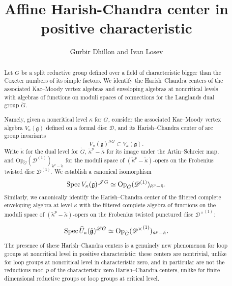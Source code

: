 \documentclass{amsart}
\title{Affine Harish-Chandra center in positive characteristic}
\author{Gurbir Dhillon and Ivan Losev}
\theoremstyle{definition}
\newcommand{\fg}{\mathfrak{g}}
\newcommand{\Spec}{\on{Spec}\hspace{.5mm}}
\newcommand{\fr}{^\on{(1)}}
\newcommand{\sD}{\mathscr{D}}
\newcommand{\on}{\mathrm}
\newcommand{\Jet}{\mathscr{J}}
\newcommand{\Loop}{\mathscr{L}}
\newcommand{\pD}{\sD^\times}
\newcommand{\ckappa}{\check{\kappa}}
\newcommand{\Op}{\on{Op}}
\newcommand{\ASk}{\ckappa^p - \ckappa}
\numberwithin{equation}{section}
\begin{document}
\begin{abstract} { Let $G$ be a split reductive group defined over a field of characteristic bigger than the Coxeter numbers of its simple factors. We identify the Harish--Chandra centers of the associated Kac--Moody vertex algebras and enveloping algebras at noncritical levels  with algebras of functions on moduli spaces of connections for the Langlands dual group $\check{G}$.


Namely, given a noncritical level $\kappa$ for $G$,  consider the associated Kac--Moody vertex algebra $V_\kappa(\fg)$ defined on a formal disc $\sD$, and its Harish--Chandra center of arc group invariants $$V_\kappa(\fg)^{\Jet G} \subset V_\kappa(\fg).$$
Write $\ckappa$ for the dual level for $\check{G}$, $\ckappa^p - \ckappa$ for its image under the Artin--Schreier map, and $\Op_{\check{G}}(\sD\fr)_{\ASk}$ for the moduli space of $(\ckappa^p - \ckappa)$-opers on the Frobenius twisted disc $\sD\fr$. We establish a canonical isomorphism 
$$\Spec V_\kappa(\fg)^{\Jet G} \simeq \Op_{\check{G}}(\sD\fr)_{\ASk}.$$
Similarly, we canonically identify the Harish--Chandra center of the filtered complete enveloping algebra at level $\kappa$ with the filtered complete algebra of functions on the moduli space of $(\ASk)$-opers on the Frobenius twisted punctured disc ${\pD}\fr$:

$$\Spec \widehat{U}_{\kappa}(\hat{\fg})^{\Loop G} \simeq \Op_{\check{G}}({\pD}\fr)_{\ASk}.$$

The presence of these Harish--Chandra centers is  a genuinely new phenomenon for loop groups at noncritical level in positive characteristic: these centers  are nontrivial, unlike for loop groups at noncritical level in characteristic zero, and in particular are not the reductions mod $p$ of the characteristic zero Harish--Chandra centers, unlike for  finite dimensional reductive groups or loop groups at critical level. 
}

\end{abstract}
\end{document}
